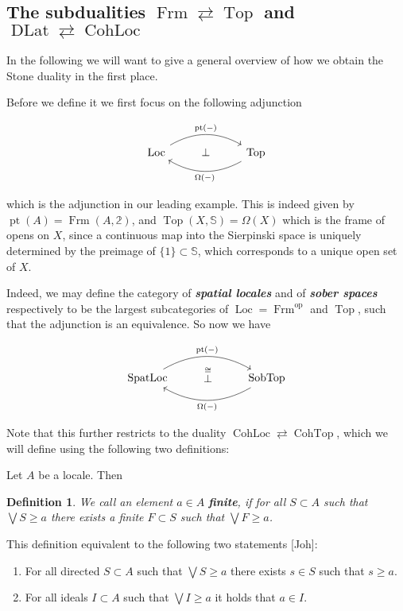 \documentclass[12pt,a4paper]{article}
\newtheorem{definition}{Definition}[section] %
\DeclareMathOperator{\Frm}{Frm}
\DeclareMathOperator{\Top}{Top}
\DeclareMathOperator{\op}{op}
\DeclareMathOperator{\Spat}{SpatLoc}
\DeclareMathOperator{\Sob}{SobTop}
\DeclareMathOperator{\DLat}{DLat}
\DeclareMathOperator{\Loc}{Loc}
\DeclareMathOperator{\CohLoc	}{CohLoc}
\DeclareMathOperator{\CohTop}{CohTop}
\DeclareMathOperator{\pt}{pt}
\begin{document}
\subsection{The subdualities $\Frm \rightleftarrows \Top$ and $\DLat \rightleftarrows \CohLoc$ }
In the following we will want to give a general overview of how we obtain the Stone duality in the first place.

Before we define it we first focus on the following adjunction

\[\begin{tikzcd}
	\Loc & \bot & \Top
	\arrow["{\pt(-)}", bend left, from=1-1, to=1-3]
	\arrow["{\Omega(-)}", bend left, from=1-3, to=1-1]
\end{tikzcd}\]
 
 which is  the adjunction in our leading example. This is indeed given by $\pt(A) = \Frm(A, \mathbb{2})$, and $\Top(X, \mathbb{S}) = \Omega(X)$ which is the frame of opens on $X$, since a continuous map into the Sierpinski space is  uniquely determined by the preimage of $\{1\} \subset \mathbb{S}$, which corresponds to a unique open set of $X$. 
 
 Indeed, we may define the category of \emph{\textbf{spatial locales}} and of \emph{\textbf{sober spaces}} respectively to be the largest subcategories of $\Loc = \Frm^{\op}$ and $\Top$, such that the adjunction is an equivalence. So now we have 
 
 \[\begin{tikzcd}
	\Spat & \stackrel{\cong}{\bot} & \Sob
	\arrow["{\pt(-)}", bend left, from=1-1, to=1-3]
	\arrow["{\Omega(-)}", bend left, from=1-3, to=1-1]
\end{tikzcd}\]

Note that this further restricts to the duality $\CohLoc	\rightleftarrows \CohTop$, which we will define using the following two definitions:

Let $A$ be a locale. Then 

\begin{definition}
	We call an element $a \in A$ \textbf{finite}, if for all $S \subset A$ such that $\bigvee S \geq a$ there exists a finite $F \subset S$ such that $\bigvee F \geq a$. 
\end{definition}

This definition equivalent to the following two statements [Joh]:
\begin{enumerate}
	\item For all directed $S \subset A$ such that $\bigvee S \geq a$ there exists $s \in S$ such that $s \geq a$.
	\item For all ideals $I \subset A$ such that $\bigvee I \geq a$ it holds that $a \in I$. 
\end{enumerate}
\end{document}
